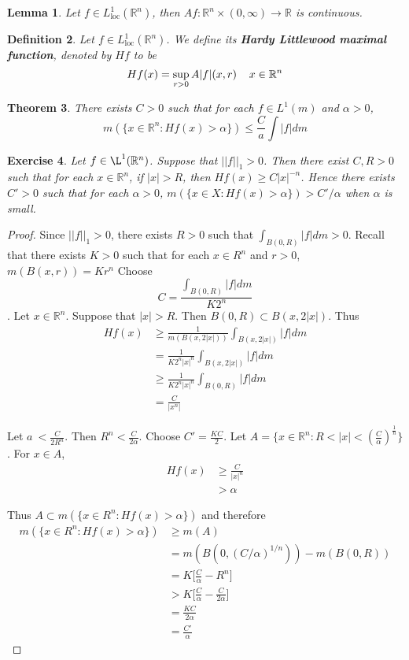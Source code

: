 \documentclass[12pt]{amsart}
\newtheorem{thm}{Theorem}[subsection]
\newtheorem{lem}[thm]{Lemma}
\newtheorem{defn}[thm]{Definition}
\newtheorem{ex}[thm]{Exercise}
\newcommand{\al}{\alpha}
\newcommand{\R}{\mathbb{R}}
\newcommand{\Ll}{L^1_{\text{loc}}(\R^n)}
\begin{document}
\begin{lem}
	Let $f \in \Ll$, then $Af:\R^n \times (0, \infty)\rightarrow \R$ is continuous.
\end{lem}

\begin{defn}
	Let $f \in \Ll$. We define its \textbf{Hardy Littlewood maximal function}, denoted by $Hf$ to be $$Hf(x) = \sup_{r>0} A|f|(x,r) \hspace{4mm} x \in \R^n$$
\end{defn}

\begin{thm}
	There exists $C >0$ such that for each $f \in L^1(m)$ and $\al > 0$, $$m(\{x \in \R^n: Hf(x) > \al\}) \leq \frac{C}{a} \int |f|dm$$
\end{thm}

\begin{ex}
	Let $f \in \L^1(\R^n)$. Suppose that $||f||_1>0$. Then there exist $C,R>0$ such that for each $x \in \R^n$, if $|x| > R$, then $Hf(x) \geq C|x|^{-n}$. Hence there exists $C' > 0$ such that for each $\al >0$, $m(\{x \in X: Hf(x)>\alpha\}) > C'/\al$ when $\al$ is small. 
\end{ex}

\begin{proof}
	Since $||f||_1 >0$, there exists $R>0$ such that $\int_{B(0,R)}|f|dm >0$. Recall that there exists $K>0$ such that for each $x \in R^n$ and $r>0$, $m(B(x,r)) = Kr^n$ Choose $$C = \frac{\int_{B(0,R)}|f|dm}{K2^n}$$. Let $x \in \R^n$. Suppose that $|x|>R$. Then $B(0,R) \subset B(x,2|x|)$. Thus 
	\begin{align*}
		Hf(x) 
		&\geq \frac{1}{m(B(x,2|x|))}\int_{B(x,2|x|)}|f|dm\\
		&= \frac{1}{K2^n|x|^n}\int_{B(x,2|x|)}|f|dm \\
		&\geq \frac{1}{K2^n|x|^n}\int_{B(0,R)}|f|dm \\
		&= \frac{C}{|x^n|}
	\end{align*}
	
	Let $a\ < \frac{C}{2R^n}$. Then $R^n < \frac{C}{2 \al}$. Choose $C' =\frac{KC}{2}$. Let $A = \{x \in \R^n: R < |x|< (\frac{C}{\al})^{\frac{1}{n}}\}$. For $x \in A$, 
	\begin{align*}
		Hf(x) 
		&\geq \frac{C}{|x|^n} \\
		& > \al
	\end{align*}
	
	Thus $A \subset m(\{x \in R^n: Hf(x)> \al\})$ and therefore 
	\begin{align*}
		m(\{x \in R^n: Hf(x)> \al\}) 
		&\geq m(A) \\
		&= m(B(0,(C/\al)^{1/n})) - m(B(0,R)) \\
		&= K\bigg [\frac{C}{\al} - R^n \bigg] \\
		&> K\bigg[\frac{C}{\al} - \frac{C}{2 \al}\bigg] \\
		&= \frac{KC}{2 \al}\\
		&= \frac{C'}{\al}
	\end{align*}
\end{proof}
\end{document}
